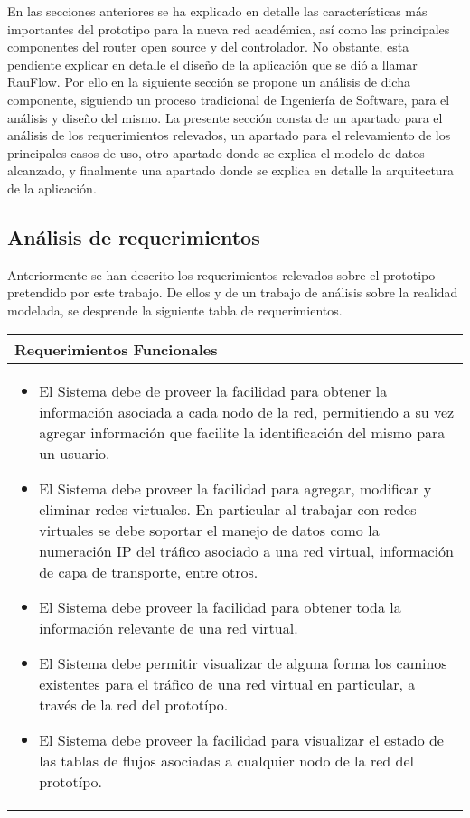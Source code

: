 En las secciones anteriores se ha explicado en detalle las caracter\'isticas m\'as importantes del prototipo para la nueva red acad\'emica, as\'i como las principales componentes del router open source y del controlador. No obstante, esta pendiente explicar en detalle el dise\~no de la aplicaci\'on que se di\'o a llamar RauFlow. Por ello en la siguiente secci\'on se propone un an\'alisis de dicha componente, siguiendo un proceso tradicional de Ingenier\'ia de Software, para el an\'alisis y dise\~no del mismo. La presente secci\'on consta de un apartado para el an\'alisis de los requerimientos relevados, un apartado para el relevamiento de los principales casos de uso, otro apartado donde se explica el modelo de datos alcanzado, y finalmente una apartado donde se explica en detalle la arquitectura de la aplicaci\'on.  

\subsection[An\'alisi de requerimientos]{An\'alisis de requerimientos}

Anteriormente se han descrito los requerimientos relevados sobre el prototipo pretendido por este trabajo. De ellos y de un trabajo de an\'alisis sobre la realidad modelada, se desprende la siguiente tabla de requerimientos.

\clearpage
\begin{table}[Htl]\centering
\begin{tabularx}{\textwidth}{|>{\setlength\hsize{1.0\hsize}\setlength\linewidth{\hsize}}X|}
\hline
Requerimientos Funcionales\\ \hline
\hline
\begin{itemize}
\item El Sistema debe de proveer la facilidad para obtener la informaci\'on asociada a cada nodo de la red, permitiendo a su vez agregar informaci\'on que facilite la identificaci\'on del mismo para un usuario.
\item El Sistema debe proveer la facilidad para agregar, modificar y eliminar redes virtuales. En particular al trabajar con redes virtuales se debe soportar el manejo de datos como la numeraci\'on IP del tr\'afico asociado a una red virtual, informaci\'on de capa de transporte, entre otros.
\item El Sistema debe proveer la facilidad para obtener toda la informaci\'on relevante de una red virtual.
\item El Sistema debe permitir visualizar de alguna forma los caminos existentes para el tr\'afico de una red virtual en particular, a trav\'es de la red del protot\'ipo.
\item El Sistema debe proveer la facilidad para visualizar el estado de las tablas de flujos asociadas a cualquier nodo de la red del protot\'ipo.
\end{itemize}\\
\hline
\end{tabularx}
\end{table}

